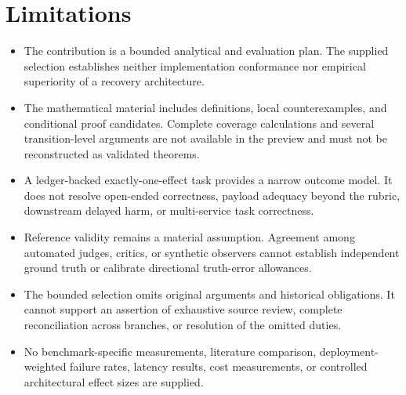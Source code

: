 \documentclass[11pt]{article}
\begin{document}
\section{Limitations}
\begin{itemize}
\item The contribution is a bounded analytical and evaluation plan. The supplied selection establishes neither implementation conformance nor empirical superiority of a recovery architecture.
\item The mathematical material includes definitions, local counterexamples, and conditional proof candidates. Complete coverage calculations and several transition-level arguments are not available in the preview and must not be reconstructed as validated theorems.
\item A ledger-backed exactly-one-effect task provides a narrow outcome model. It does not resolve open-ended correctness, payload adequacy beyond the rubric, downstream delayed harm, or multi-service task correctness.
\item Reference validity remains a material assumption. Agreement among automated judges, critics, or synthetic observers cannot establish independent ground truth or calibrate directional truth-error allowances.
\item The bounded selection omits original arguments and historical obligations. It cannot support an assertion of exhaustive source review, complete reconciliation across branches, or resolution of the omitted duties.
\item No benchmark-specific measurements, literature comparison, deployment-weighted failure rates, latency results, cost measurements, or controlled architectural effect sizes are supplied.
\end{itemize}
\end{document}
